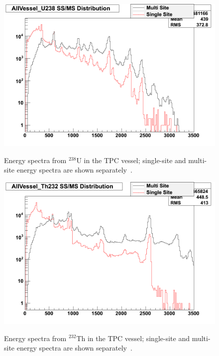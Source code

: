 \begin{figure}
\begin{center}
\includegraphics[keepaspectratio=true,width=\textwidth]{AllVessel_U238_single_multi_site_spec.png}
\end{center}
\renewcommand{\baselinestretch}{1}
\small\normalsize
\begin{quote}
\caption{Energy spectra from $^{238}$U in the TPC vessel; single-site and multi-site energy spectra are shown separately~\cite{MCDocumentRun2a}.}
\label{fig:UGeantSpectra}
\end{quote}
\end{figure}
\renewcommand{\baselinestretch}{2}
\small\normalsize

\begin{figure}
\begin{center}
\includegraphics[keepaspectratio=true,width=\textwidth]{AllVessel_Th232_single_multi_site_spec.png}
\end{center}
\renewcommand{\baselinestretch}{1}
\small\normalsize
\begin{quote}
\caption{Energy spectra from $^{232}$Th in the TPC vessel; single-site and multi-site energy spectra are shown separately~\cite{MCDocumentRun2a}.}
\label{fig:ThGeantSpectra}
\end{quote}
\end{figure}
\renewcommand{\baselinestretch}{2}
\small\normalsize

